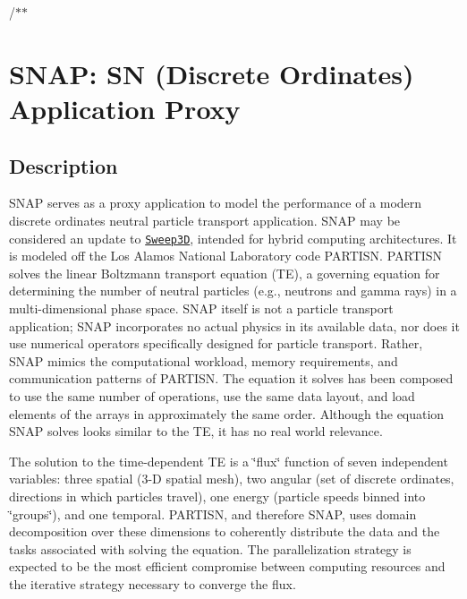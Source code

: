/$\ast$$\ast$

\section*{S\-N\-A\-P\-: S\-N (Discrete Ordinates) Application Proxy}

\subsection*{Description}

S\-N\-A\-P serves as a proxy application to model the performance of a modern discrete ordinates neutral particle transport application. S\-N\-A\-P may be considered an update to \href{http://www.ccs3.lanl.gov/PAL/software.shtml}{\tt Sweep3\-D}, intended for hybrid computing architectures. It is modeled off the Los Alamos National Laboratory code P\-A\-R\-T\-I\-S\-N. P\-A\-R\-T\-I\-S\-N solves the linear Boltzmann transport equation (T\-E), a governing equation for determining the number of neutral particles (e.\-g., neutrons and gamma rays) in a multi-\/dimensional phase space. S\-N\-A\-P itself is not a particle transport application; S\-N\-A\-P incorporates no actual physics in its available data, nor does it use numerical operators specifically designed for particle transport. Rather, S\-N\-A\-P mimics the computational workload, memory requirements, and communication patterns of P\-A\-R\-T\-I\-S\-N. The equation it solves has been composed to use the same number of operations, use the same data layout, and load elements of the arrays in approximately the same order. Although the equation S\-N\-A\-P solves looks similar to the T\-E, it has no real world relevance.

The solution to the time-\/dependent T\-E is a \char`\"{}flux\char`\"{} function of seven independent variables\-: three spatial (3-\/\-D spatial mesh), two angular (set of discrete ordinates, directions in which particles travel), one energy (particle speeds binned into \char`\"{}groups\char`\"{}), and one temporal. P\-A\-R\-T\-I\-S\-N, and therefore S\-N\-A\-P, uses domain decomposition over these dimensions to coherently distribute the data and the tasks associated with solving the equation. The parallelization strategy is expected to be the most efficient compromise between computing resources and the iterative strategy necessary to converge the flux.

